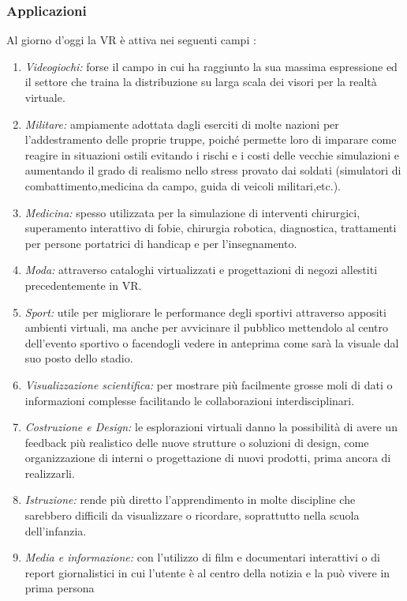 \subsubsection{Applicazioni }
Al giorno d'oggi la VR è attiva nei seguenti campi \cite{VRApplications}:
\begin{enumerate}
	\item \textit{Videogiochi:} forse il campo in cui ha raggiunto la sua massima espressione ed il settore che traina la distribuzione su larga scala dei visori per la realtà virtuale.
	\item \textit{Militare:} ampiamente adottata dagli eserciti di molte nazioni per l'addestramento delle proprie truppe, poiché permette loro di imparare come reagire in situazioni ostili evitando i rischi e i costi delle vecchie simulazioni e aumentando il grado di realismo nello stress provato dai soldati (simulatori di combattimento,medicina da campo, guida di veicoli militari,etc.).
	\item \textit{Medicina:} spesso utilizzata per la simulazione di interventi chirurgici, superamento interattivo di fobie, chirurgia robotica, diagnostica, trattamenti per persone portatrici di handicap e per l'insegnamento.
	\item \textit{Moda:} attraverso cataloghi virtualizzati e progettazioni di negozi allestiti precedentemente in VR.
	\item \textit{Sport:} utile per migliorare le performance degli sportivi attraverso appositi ambienti virtuali, ma anche per avvicinare il pubblico mettendolo al centro dell'evento sportivo o facendogli vedere in anteprima come sarà la visuale dal suo posto dello stadio.
	\item \textit{Visualizzazione scientifica:} per mostrare più facilmente grosse moli di dati o informazioni complesse facilitando le collaborazioni interdisciplinari.
	\item \textit{Costruzione e Design:} le esplorazioni virtuali danno la possibilità di avere un feedback più realistico delle nuove strutture o soluzioni di design, come organizzazione di interni o progettazione di nuovi prodotti, prima ancora di realizzarli.
	\item \textit{Istruzione:} rende più diretto l'apprendimento in molte discipline che sarebbero difficili da visualizzare o ricordare, soprattutto nella scuola dell'infanzia.
	\item \textit{Media e informazione:} con l'utilizzo di film e documentari interattivi o di report giornalistici in cui l'utente è al centro della notizia e la può vivere in prima persona
	
\end{enumerate}
\vspace{0.4cm}
